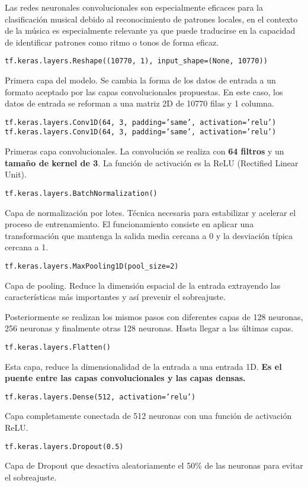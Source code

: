 Las redes neuronales convolucionales son especialmente eficaces para la clasificación musical debido al reconocimiento de patrones locales, en el contexto de la música es especialmente relevante ya que puede traducirse en la capacidad de identificar patrones como ritmo o tonos de forma eficaz.

\texttt{tf.keras.layers.Reshape((10770, 1), input\_shape=(None, 10770))}

Primera capa del modelo. Se cambia la forma de los datos de entrada a un formato aceptado por las capas convolucionales propuestas. En este caso, los datos de entrada se reforman a una matriz 2D de 10770 filas y 1 columna.

\texttt{tf.keras.layers.Conv1D(64, 3, padding='same', activation='relu')}
\texttt{tf.keras.layers.Conv1D(64, 3, padding='same', activation='relu')}

Primeras capa convolucionales. La convolución se realiza con \textbf{64 filtros} y un \textbf{tamaño de kernel de 3}. La función de activación es la ReLU (Rectified Linear Unit).

\texttt{tf.keras.layers.BatchNormalization()}

Capa de normalización por lotes. Técnica necesaria para estabilizar y acelerar el proceso de entrenamiento. El funcionamiento consiste en aplicar una transformación que mantenga la salida media cercana a 0 y la desviación típica cercana a 1.

\texttt{tf.keras.layers.MaxPooling1D(pool\_size=2)}

Capa de pooling. Reduce la dimensión espacial de la entrada extrayendo las características más importantes y así prevenir el sobreajuste.

Posteriormente se realizan los mismos pasos con diferentes capas de 128 neuronas, 256 neuronas y finalmente otras 128 neuronas. Hasta llegar a las últimas capas.

\texttt{tf.keras.layers.Flatten()}

Esta capa, reduce la dimensionalidad de la entrada a una entrada 1D. \textbf{Es el puente entre las capas convolucionales y las capas densas.}

\texttt{tf.keras.layers.Dense(512, activation='relu')}

Capa completamente conectada de 512 neuronas con una función de activación ReLU.

\texttt{tf.keras.layers.Dropout(0.5)}

Capa de Dropout que desactiva aleatoriamente el 50\% de las neuronas para evitar el sobreajuste.

